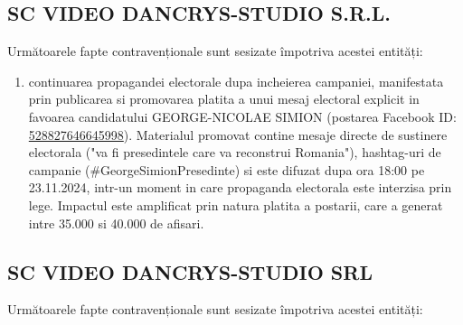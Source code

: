 \documentclass[a4paper,12pt]{article}
\begin{document}
\vspace{0.5cm}

\subsection{SC VIDEO DANCRYS-STUDIO S.R.L.}
Următoarele fapte contravenționale sunt sesizate împotriva acestei entități:

\begin{enumerate}[leftmargin=*, label=\arabic*.)]
    \item continuarea propagandei electorale dupa incheierea campaniei, manifestata prin publicarea si promovarea platita a unui mesaj electoral explicit in favoarea candidatului GEORGE-NICOLAE SIMION (postarea Facebook ID: \href{https://www.facebook.com/ads/library/?id=528827646645998}{528827646645998}). Materialul promovat contine mesaje directe de sustinere electorala ("va fi presedintele care va reconstrui Romania"), hashtag-uri de campanie (\#GeorgeSimionPresedinte) si este difuzat dupa ora 18:00 pe 23.11.2024, intr-un moment in care propaganda electorala este interzisa prin lege. Impactul este amplificat prin natura platita a postarii, care a generat intre 35.000 si 40.000 de afisari.
\end{enumerate}

\vspace{0.5cm}

\subsection{SC VIDEO DANCRYS-STUDIO SRL}
Următoarele fapte contravenționale sunt sesizate împotriva acestei entități:
\end{document}
